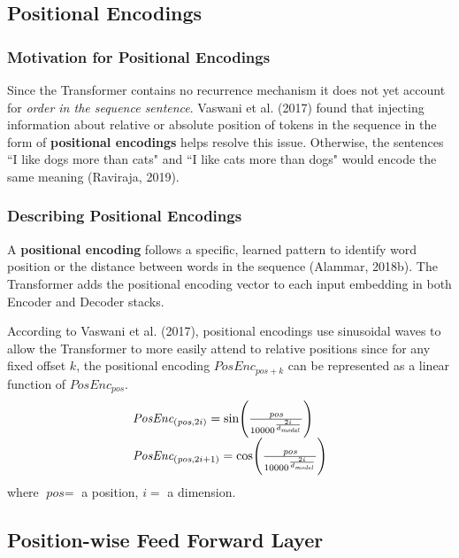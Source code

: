 \subsection{Positional Encodings} \label{sec:PosEncodings}

\subsubsection{Motivation for Positional Encodings}

Since the Transformer contains no recurrence mechanism it does not yet account for \emph{order in the sequence sentence}. Vaswani et al. (2017) found that injecting information about relative or absolute position of tokens in the sequence in the form of \textbf{positional encodings} helps resolve this issue. 
Otherwise, the sentences ``I like dogs more than cats" and ``I like cats more than dogs" would encode the same meaning (Raviraja, 2019). 

\subsubsection{Describing Positional Encodings}

A \textbf{positional encoding} follows a specific, learned pattern to identify word position or the distance between words in the sequence (Alammar, 2018b). The Transformer adds the positional encoding vector to each input embedding in both Encoder and Decoder stacks. \newline 

According to Vaswani et al. (2017), positional encodings use sinusoidal waves to allow the Transformer to more easily attend to relative positions since for any fixed offset $k$, the positional encoding $\textit{PosEnc}_{\textit{pos} + k}$ can be represented as a linear function of $\textit{PosEnc}_{\textit{pos}}$.
$$
\begin{array}{ll}
\textit{PosEnc}_{\Large (\textit{pos}, 2i)} = \text{sin} \Bigg(\frac {\textit{pos}} {10000^{\Large \frac {2i} {d_{\textit{model}}} } }  \Bigg) \\
\textit{PosEnc}_{\Large (\textit{pos}, 2i + 1)} = \text{cos} \Bigg(\frac {\textit{pos}} {10000^{\Large \frac {2i} {d_{\textit{model}}} } }  \Bigg)
\end{array}
$$
where $\textit{pos} = $ a position, $i = $ a dimension.


\subsection{Position-wise Feed Forward Layer} \label{sec:PositionwiseFFNLayers}

